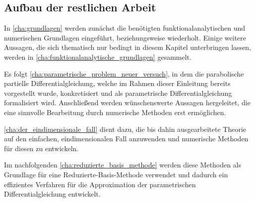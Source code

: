 \subsection*{Aufbau der restlichen Arbeit}


In \autoref{cha:grundlagen} werden zunächst die benötigten funktionalanalytischen und numerischen Grundlagen eingeführt, beziehungsweise wiederholt.
Einige weitere Aussagen, die sich thematisch nur bedingt in diesem Kapitel unterbringen lassen, werden in \autoref{cha:funktionalanalytische_grundlagen} gesammelt.

Es folgt \autoref{cha:parametrische_problem_neuer_versuch}, in dem die parabolische partielle Differentialgleichung, welche im Rahmen dieser Einleitung bereits vorgestellt wurde, konkretisiert und als parametrische Differentialgleichung formalisiert wird.
Anschließend werden wünschenswerte Aussagen hergeleitet, die eine sinnvolle Bearbeitung durch numerische Methoden erst ermöglichen.

\autoref{cha:der_eindimensionale_fall} dient dazu, die bis dahin ausgearbeitete Theorie auf den einfachen, eindimensionalen Fall anzuwenden und numerische Methoden für diesen zu entwickeln.

Im nachfolgenden \autoref{cha:reduzierte_basis_methode} werden diese Methoden als Grundlage für eine Reduzierte-Basis-Methode verwendet und dadurch ein effizientes Verfahren für die Approximation der parametrischen Differentialgleichung entwickelt.


